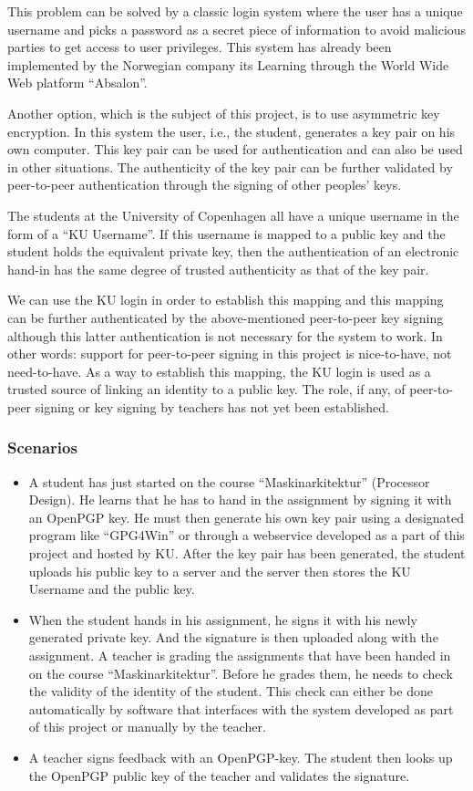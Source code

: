 \documentclass[11pt,a4paper]{report}
\begin{document}
This problem can be solved by a classic login system where the user has a unique username and picks a password as a secret piece of information to avoid malicious parties to get access to user privileges. This system has already been implemented by the Norwegian company its Learning through the World Wide Web platform ``Absalon''.

Another option, which is the subject of this project, is to use asymmetric key encryption. In this system the user, i.e., the student, generates a key pair on his own computer. This key pair can be used for authentication and can also be used in other situations. The authenticity of the key pair can be further validated by peer-to-peer authentication through the signing of other peoples' keys.

The students at the University of Copenhagen all have a unique username in the form of a ``KU Username''. If this username is mapped to a public key and the student holds the equivalent private key, then the authentication of an electronic hand-in has the same degree of trusted authenticity as that of the key pair.

We can use the KU login in order to establish this mapping and this mapping can be further authenticated by the above-mentioned peer-to-peer key signing although this latter authentication is not necessary for the system to work. In other words: support for peer-to-peer signing in this project is nice-to-have, not need-to-have. As a way to establish this mapping, the KU login is used as a trusted source of linking an identity to a public key. The role, if any, of peer-to-peer signing or key signing by teachers has not yet been established.


\subsubsection{Scenarios}
\begin{itemize}
\item A student has just started on the course ``Maskinarkitektur'' (Processor Design). He learns that he has to hand in the assignment by signing it with an OpenPGP key. He must then generate his own key pair using a designated program like ``GPG4Win'' or through a webservice developed as a part of this project and hosted by KU. After the key pair has been generated, the student uploads his public key to a server and the server then stores the KU Username and the public key.
\item When the student hands in his assignment, he signs it with his newly generated private key. And the signature is then uploaded along with the assignment. A teacher is grading the assignments that have been handed in on the course ``Maskinarkitektur''. Before he grades them, he needs to check the validity of the identity of the student. This check can either be done automatically by software that interfaces with the system developed as part of this project or manually by the teacher.
\item A teacher signs feedback with an OpenPGP-key. The student then looks up the OpenPGP public key of the teacher and validates the signature.
\end{itemize}
\end{document}
